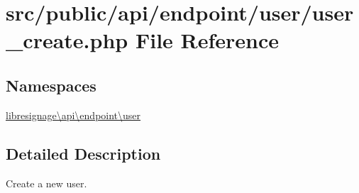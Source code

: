 \hypertarget{src_2public_2api_2endpoint_2user_2user__create_8php}{}\section{src/public/api/endpoint/user/user\+\_\+create.php File Reference}
\label{src_2public_2api_2endpoint_2user_2user__create_8php}
\subsection*{Namespaces}
\begin{DoxyCompactItemize}
\item 
 \hyperlink{namespacelibresignage_1_1api_1_1endpoint_1_1user}{libresignage\textbackslash{}api\textbackslash{}endpoint\textbackslash{}user}
\end{DoxyCompactItemize}


\subsection{Detailed Description}
Create a new user.

